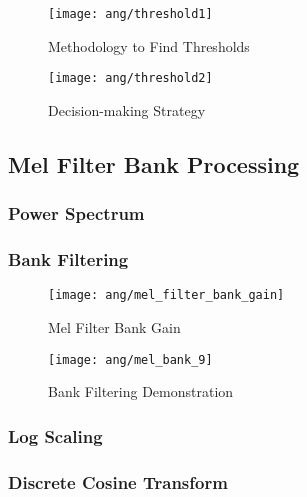 \begin{figure}[H]
\centering
\texttt{[image: ang/threshold1]}
\caption{Methodology to Find Thresholds}
\label{threshold1}
\end{figure}

\begin{figure}[H]
\centering
\texttt{[image: ang/threshold2]}
\caption{Decision-making Strategy}
\label{threshold2}
\end{figure}


\subsection{Mel Filter Bank Processing}

\subsubsection{Power Spectrum}


\subsubsection{Bank Filtering}

\begin{figure}[H]
\centering
\texttt{[image: ang/mel\_filter\_bank\_gain]}
\caption{Mel Filter Bank Gain}
\end{figure}

\begin{figure}[H]
\centering
\texttt{[image: ang/mel\_bank\_9]}
\caption{Bank Filtering Demonstration}
\end{figure}


\subsubsection{Log Scaling}


\subsubsection{Discrete Cosine Transform}
